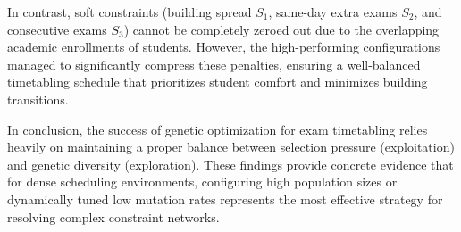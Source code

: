 In contrast, soft constraints (building spread $S_1$, same-day extra exams $S_2$, and consecutive exams $S_3$) cannot be completely zeroed out due to the overlapping academic enrollments of students. However, the high-performing configurations managed to significantly compress these penalties, ensuring a well-balanced timetabling schedule that prioritizes student comfort and minimizes building transitions.

In conclusion, the success of genetic optimization for exam timetabling relies heavily on maintaining a proper balance between selection pressure (exploitation) and genetic diversity (exploration). These findings provide concrete evidence that for dense scheduling environments, configuring high population sizes or dynamically tuned low mutation rates represents the most effective strategy for resolving complex constraint networks.
